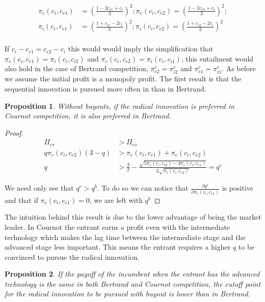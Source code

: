 \documentclass[11pt]{article}
\newtheorem{proposition}{Proposition}
\begin{document}
\begin{align*}
\pi_{e}(c_i,c_{e1}) &= \left(\frac{1-2 c_{e1}+c_{i}}{3}  \right)^2;
\pi_{e}(c_i,c_{e2}) = \left(\frac{1-2 c_{e2}+c_{i}}{3}  \right)^2; \\
\pi_{i}(c_i,c_{e1}) &= \left(\frac{1+ c_{i1}-2c_{i}}{3}  \right)^2;
\pi_{i}(c_i,c_{e2}) = \left(\frac{1+ c_{i2}-2c_{i}}{3}  \right)^2 \\
\end{align*}


If $c_i-c_{e1}=c_{e2}-c_i$ this would would imply the simplification that $\pi_{e}(c_i,c_{e1})=\pi_{i}(c_{i},c_{i2})$ and $\pi_{e}(c_i,c_{e2})=\pi_{i}(c_{i},c_{i1})$, this entailment would also hold in the case of Bertrand competition, $\pi_{e2}^{c}=\pi_{i2}^{c}$ and $\pi_{e1}^{c}=\pi_{i1}^{c}$. As before we assume the initial profit is a monopoly profit. The first result is that the sequential innovation is pursued more often in than in Bertrand.

\begin{proposition}
Without buyouts, if the radical innovation is preferred in Cournot competition, it is also preferred in Bertrand. 
\end{proposition}

\begin{proof}
\begin{align*}
\Pi_{er}&>\Pi_{es} \\
q \pi_{e}(c_i,c_{e2}) (3-q) &> \pi_{e}(c_i,c_{e1})+\pi_{e}(c_i,c_{e2}) \\
q&> 
 \frac{3}{2}-\frac{ \sqrt{5 \pi_{e}(c_i,c_{e2})-4 \pi_{e}(c_i,c_{e1})}}{2 \sqrt{\pi_{e}(c_i,c_{e2})}}=q^{c}
\end{align*}

We need only see that $q^{c}>q^{b}$. To do so we can notice that $\frac{\partial q^c}{\partial \pi_{e}(c_i,c_{e1}) }$ is positive and that if $\pi_{e}(c_i,c_{e1})=0$, we are left with $q^{b}$
\end{proof}

The intuition behind this result is due to the lower advantage of being the market leader. In Cournot the entrant earns a profit even with the intermediate technology which makes the lag time between the intermediate stage and the advanced stage less important. This means the entrant requires a higher $q$ to be convinced to pursue the radical innovation.  

\begin{proposition}
If the payoff of the incumbent when the entrant has the advanced technology is the same in both Bertrand and Cournot competition, the cutoff point for the radical innovation to be pursued with buyout is lower than in Bertrand. 
\end{proposition}
\end{document}
